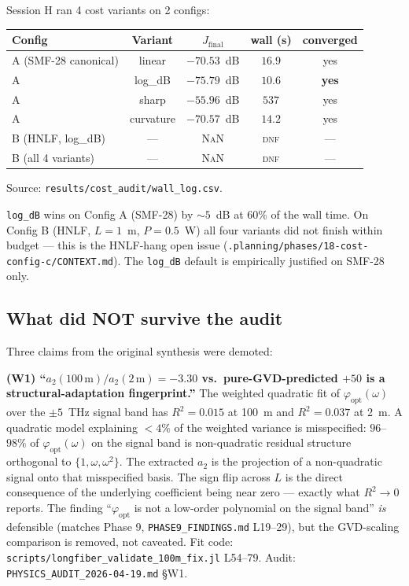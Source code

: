 \documentclass[12pt,a4paper]{article}
\theoremstyle{definition}
\begin{document}
Session H ran 4 cost variants on 2 configs:
\begin{center}
\begin{tabular}{lcccc}
\toprule
Config & Variant & $J_\text{final}$ & wall (s) & converged \\
\midrule
A (SMF-28 canonical) & linear     & $-70.53$~dB & $16.9$ & yes \\
A                    & log\_dB    & $\mathbf{-75.79}$~dB & $\mathbf{10.6}$ & \textbf{yes} \\
A                    & sharp      & $-55.96$~dB & $537$  & yes \\
A                    & curvature  & $-70.57$~dB & $14.2$ & yes \\
B (HNLF, log\_dB)    & --- & \textsc{NaN} & \textsc{dnf} & --- \\
B (all 4 variants)   & --- & \textsc{NaN} & \textsc{dnf} & --- \\
\bottomrule
\end{tabular}
\end{center}
Source: \texttt{results/cost\_audit/wall\_log.csv}.

\begin{advisory}
\texttt{log\_dB} wins on Config A (SMF-28) by $\sim 5$~dB at 60\%
of the wall time. On Config B (HNLF, $L{=}1$~m, $P{=}0.5$~W) all four
variants did not finish within budget --- this is the HNLF-hang open
issue (\texttt{.planning/phases/18-cost-config-c/CONTEXT.md}). The
\texttt{log\_dB} default is empirically justified on SMF-28 only.
\end{advisory}

\subsection{What did NOT survive the audit}
\label{sec:april-wrong}

Three claims from the original synthesis were demoted:

\textbf{(W1) ``$a_2(100\,\mathrm{m})/a_2(2\,\mathrm{m}) = -3.30$ vs.\ pure-GVD-predicted $+50$ is a structural-adaptation fingerprint.''}
The weighted quadratic fit of $\varphi_\text{opt}(\omega)$ over the
$\pm 5$~THz signal band has $R^2 = 0.015$ at 100~m and $R^2 = 0.037$
at 2~m. A quadratic model explaining $< 4\%$ of the weighted
variance is misspecified: $96$--$98\%$ of $\varphi_\text{opt}(\omega)$
on the signal band is non-quadratic residual structure orthogonal to
$\{1, \omega, \omega^2\}$. The extracted $a_2$ is the projection of
a non-quadratic signal onto that misspecified basis. The sign flip
across $L$ is the direct consequence of the underlying coefficient
being near zero --- exactly what $R^2 \to 0$ reports. The finding ``$\varphi_\text{opt}$ is not a low-order
polynomial on the signal band'' \emph{is} defensible (matches Phase 9,
\texttt{PHASE9\_FINDINGS.md} L19--29), but the
GVD-scaling comparison is removed, not caveated. Fit code:
\texttt{scripts/longfiber\_validate\_100m\_fix.jl} L54--79. Audit:
\texttt{PHYSICS\_AUDIT\_2026-04-19.md} §W1.
\end{document}
